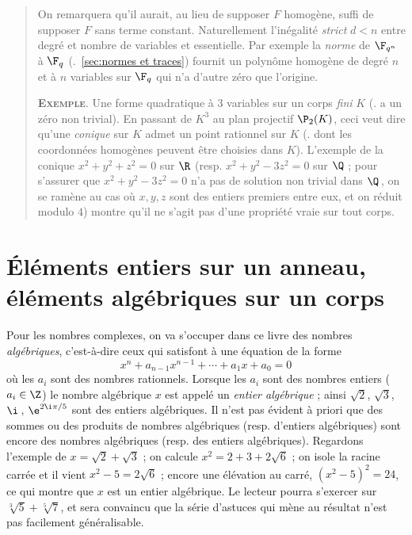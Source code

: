 \documentclass[11pt, useosf,
  title in boldface,
  theorem in new line,
  theorem numbering = section,
  number theorems separately,
]{simplivre}
\begin{document}
    \begin{quote}
        On remarquera qu'il aurait, au lieu de supposer \( F \) homogène, suffi de supposer \( F \) sans terme constant. Naturellement l'inégalité \emph{strict} \( d < n \) entre degré et nombre de variables et essentielle. Par exemple la \emph{norme} de \( \F_{q^n} \) à \( \F_q \) (\cf.~\cref{sec:normes et traces}) fournit un polynôme homogène de degré \( n \) et à \( n \) variables sur \( \F_q \) qui n'a d'autre zéro que l'origine.

        \textsc{\textbf{Exemple}}.
        Une forme quadratique à \( 3 \) variables sur un corps \emph{fini} \( K \)  (\ie. a un zéro non trivial). En passant de \( K^3 \) au plan projectif \( \P_2(K) \), ceci veut dire qu'une \emph{conique} sur \( K \) admet un point rationnel sur \( K \) (\ie. dont les coordonnées homogènes peuvent être choisies dans \( K \)). L'exemple de la conique \( x^2+y^2+z^2 = 0 \) sur \( \R \) (resp. \( x^2+y^2-3z^2 = 0 \) sur \( \Q \) ; pour s'assurer que \( x^2+y^2-3z^2 = 0 \) n'a pas de solution non trivial dans \( \Q \)\,, on se ramène au cas où \( x,y,z \) sont des entiers premiers entre eux, et on réduit modulo \( 4 \)) montre qu'il ne s'agit pas d'une propriété vraie sur tout corps.
    \end{quote}


\chapter{Éléments entiers sur un anneau, éléments algébriques sur un corps}

Pour les nombres complexes, on va s'occuper dans ce livre des nombres \emph{algébriques}, c'est-à-dire ceux qui satisfont à une équation de la forme
\[
    x^n + a_{n-1} x^{n-1} + \cdots + a_1 x + a_0 = 0
\]
où les \( a_i \) sont des nombres rationnels. Lorsque les \( a_i \) sont des nombres entiers (\( a_i \in \Z \)) le nombre algébrique \( x \) est appelé un \emph{entier algébrique} ; ainsi \( \sqrt{2} \), \( \sqrt{3} \), \( \i \)\,, \( \e^{2\i\pi/5} \) sont des entiers algébriques. Il n'est pas évident à priori que des sommes ou des produits de nombres algébriques (resp. d'entiers algébriques) sont encore des nombres algébriques (resp. des entiers algébriques). Regardons l'exemple de \( x = \sqrt{2}+\sqrt{3} \) ; on calcule \( x^2 = 2+3+2\sqrt{6} \) ; on isole la racine carrée et il vient \( x^2-5 = 2\sqrt{6} \) ; encore une élévation au carré, \( (x^2-5)^2 = 24 \), ce qui montre que \( x \) est un entier algébrique. Le lecteur pourra s'exercer sur \( \sqrt[3]{5}+\sqrt[5]{7} \), et sera convaincu que la série d'astuces qui mène au résultat n'est pas facilement généralisable.
\end{document}
